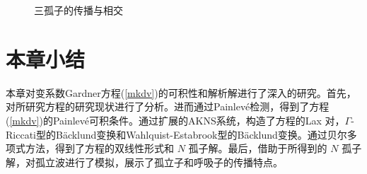 \begin{figure}[!htp]
\centering

\qquad
{}
\qquad
{}


\caption{三孤子的传播与相交}
\label{mkdv-fig2}
\end{figure}

\section{本章小结}
本章对变系数Gardner方程(\ref{mkdv})的可积性和解析解进行了深入的研究。首先，对所研究方程的研究现状进行了分析。进而通过Painlev\'{e}检测，得到了方程(\ref{mkdv})的Painlev\'{e}可积条件。通过扩展的AKNS系统，构造了方程的Lax 对，$\Gamma$-Riccati型的B\"{a}cklund变换和Wahlquist-Estabrook型的B\"{a}cklund变换。通过贝尔多项式方法，得到了方程的双线性形式和 $N$ 孤子解。最后，借助于所得到的 $N$ 孤子解，对孤立波进行了模拟，展示了孤立子和呼吸子的传播特点。



